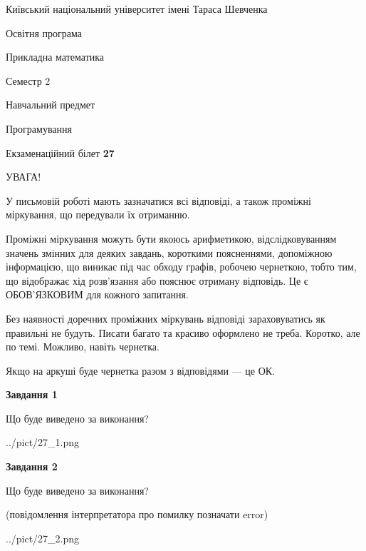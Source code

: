 \documentclass[12pt, ukrainian]{article}
\begin{document}
{{\begin {small}\par
{ \center  Київський національний університет імені Тараса Шевченка \par}
{\parbox {5 cm}{Освітня програма \hfill}{\parbox {7 cm}{Прикладна математика\hfill}}\parbox {6 cm}{\hfill Семестр 2}}\par
{\parbox {5 cm} {Навчальний предмет \hfill}\parbox {7 cm}{Програмування \hfill}\parbox {6cm}{\hfill}\par}\vspace{-7pt} \end{small}}{\center Екзаменаційний білет \No \textbf
{ 27 }\par}}
{
\begin {large}
УВАГА!

У письмовій роботі мають зазначатися всі відповіді, а також проміжні міркування, що передували їх отриманню.

Проміжні міркування можуть бути якоюсь арифметикою, відслідковуванням зна\-чень змінних для деяких завдань,
короткими поясненнями, допоміжною інформацією, що виникає під час обходу графів, робочею чернеткою,
тобто тим, що відображає хід розв’язання або пояснює отриману відповідь.
Це є ОБОВ’ЯЗКОВИМ для кожного запитання.

Без наявності доречних проміжних міркувань відповіді зараховуватись як правиль\-ні не будуть.
Писати багато та красиво оформлено не треба. Коротко, але по темі. Можли\-во, навіть чернетка.

Якщо на аркуші буде чернетка разом з відповідями --- це ОК.

\newpage

{\begin {center}\textbf{Завдання 1}\end {center}}\par
Що буде виведено за виконання?\par
\begin{center}
	{../pict/27_1.png}
\end{center}
\newpage

{\begin {center}\textbf{Завдання 2}\end {center}}\par
Що буде виведено за виконання?\par
 (повідомлення інтерпретатора про помилку позначати error)\par
\begin{center}
	{../pict/27_2.png}
\end{center}
\newpage


\end{large}}
\end{document}
